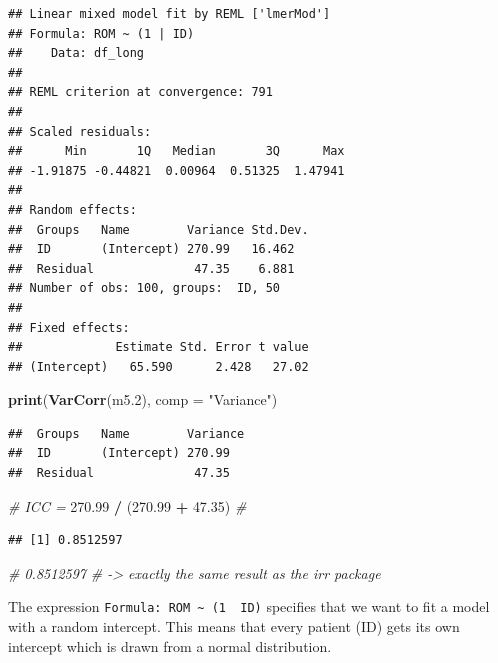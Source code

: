 \documentclass[
]{article}
\newenvironment{Shaded}{\begin{snugshade}}{\end{snugshade}}
\newcommand{\AttributeTok}[1]{\textcolor[rgb]{0.13,0.29,0.53}{#1}}
\newcommand{\CommentTok}[1]{\textcolor[rgb]{0.56,0.35,0.01}{\textit{#1}}}
\newcommand{\FloatTok}[1]{\textcolor[rgb]{0.00,0.00,0.81}{#1}}
\newcommand{\FunctionTok}[1]{\textcolor[rgb]{0.13,0.29,0.53}{\textbf{#1}}}
\newcommand{\NormalTok}[1]{#1}
\newcommand{\SpecialCharTok}[1]{\textcolor[rgb]{0.81,0.36,0.00}{\textbf{#1}}}
\newcommand{\StringTok}[1]{\textcolor[rgb]{0.31,0.60,0.02}{#1}}
\begin{document}
\begin{verbatim}
## Linear mixed model fit by REML ['lmerMod']
## Formula: ROM ~ (1 | ID)
##    Data: df_long
## 
## REML criterion at convergence: 791
## 
## Scaled residuals: 
##      Min       1Q   Median       3Q      Max 
## -1.91875 -0.44821  0.00964  0.51325  1.47941 
## 
## Random effects:
##  Groups   Name        Variance Std.Dev.
##  ID       (Intercept) 270.99   16.462  
##  Residual              47.35    6.881  
## Number of obs: 100, groups:  ID, 50
## 
## Fixed effects:
##             Estimate Std. Error t value
## (Intercept)   65.590      2.428   27.02
\end{verbatim}

\begin{Shaded}
\begin{Highlighting}[]
\FunctionTok{print}\NormalTok{(}\FunctionTok{VarCorr}\NormalTok{(m5}\FloatTok{.2}\NormalTok{), }\AttributeTok{comp =} \StringTok{"Variance"}\NormalTok{)}
\end{Highlighting}
\end{Shaded}

\begin{verbatim}
##  Groups   Name        Variance
##  ID       (Intercept) 270.99  
##  Residual              47.35
\end{verbatim}

\begin{Shaded}
\begin{Highlighting}[]
\CommentTok{\# ICC = }
\FloatTok{270.99} \SpecialCharTok{/}\NormalTok{ (}\FloatTok{270.99} \SpecialCharTok{+} \FloatTok{47.35}\NormalTok{) }\CommentTok{\# }
\end{Highlighting}
\end{Shaded}

\begin{verbatim}
## [1] 0.8512597
\end{verbatim}

\begin{Shaded}
\begin{Highlighting}[]
\CommentTok{\# 0.8512597}
\CommentTok{\# {-}\textgreater{} exactly the same result as the irr package}
\end{Highlighting}
\end{Shaded}

The expression \texttt{Formula:\ ROM\ \textasciitilde{}\ (1\ \textbar{}\ ID)} specifies that we want to fit a model with
a random intercept. This means that every patient (ID) gets its own intercept
which is drawn from a normal distribution.
\end{document}
